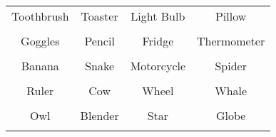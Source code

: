 \documentclass[12pt,a4paper]{article}
\begin{document}
\thispagestyle{empty}
\begin{table}[]
\centering
\Huge
\begin{tabular}{cccc}
 Toothbrush& Toaster& Light Bulb& Pillow\\  & & & \\
 Goggles& Pencil& Fridge& Thermometer\\  & & & \\
 Banana& Snake& Motorcycle& Spider\\  & & & \\
 Ruler& Cow& Wheel& Whale\\  & & & \\
 Owl& Blender& Star& Globe\\  & & & \\
\end{tabular}
\end{table}
\end{document}
